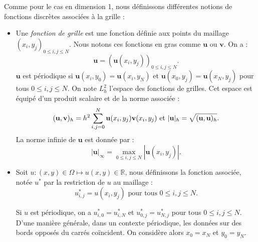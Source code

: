 Comme pour le cas en dimension 1, nous définissons différentes notions de fonctions discrètes associées à la grille :
\begin{itemize}
\item Une \textit{fonction de grille} est une fonction définie aux points du maillage $(x_i,y_j)_{0 \leq i,j \leq N}$. Nous notons ces fonctions en gras comme $\mathbf{u}$ ou $\mathbf{v}$. On a :
\begin{equation}
\mathbf{u} = \left( \mathbf{u}(x_i,y_j) \right)_{0 \leq i,j \leq N}.
\end{equation}
$\mathbf{u}$ est périodique si $\mathbf{u}(x_{i},y_0) = \mathbf{u}(x_{i},y_N)$ et $\mathbf{u}(x_{0},y_j) = \mathbf{u}(x_{N},y_j)$ pour tous $0 \leq i,j \leq N$.
On note $L^2_h$ l'espace des fonctions de grilles. Cet espace est équipé d'un produit scalaire et de la norme associée :
\begin{equation}
(\mathbf{u}, \mathbf{v})_h = h^2 \displaystyle\sum\limits_{i,j=0}^N \mathbf{u}(x_i,y_j) \mathbf{v}(x_i,y_j) \text{ et } |\mathbf{u}|_h = \sqrt{(\mathbf{u},\mathbf{u})_h}.
\end{equation}
La norme infinie de $\mathbf{u}$ est donnée par :
\begin{equation}
| \mathbf{u} |_{\infty} = \max_{0 \leq i,j \leq N} |\mathbf{u}(x_i,y_j)|.
\end{equation}

\item Soit $u : (x,y) \in \Omega \mapsto u(x,y) \in \mathbb{R}$, nous définissons la fonction associée, notée $u^*$ par la restriction de $u$ au maillage :
\begin{equation}
u^*_{i,j} = u(x_i, y_j) \text{ pour tous } 0 \leq i,j \leq N.
\end{equation}

Si $u$ est périodique, on a $u^*_{i,0}=u^*_{i,N}$ et $u^*_{0,j}=u^*_{N,j}$ pour tous $0 \leq i,j \leq N$.
D'une manière générale, dans un contexte périodique, les données sur des bords opposés du carrés coïncident. On considère alors $x_0 = x_N$ et $y_0 = y_N$.
\end{itemize}

